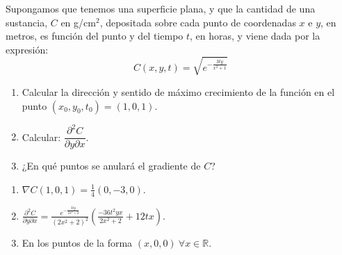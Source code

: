


{Supongamos que tenemos una superficie plana, y que la cantidad de una sustancia, $C$ en g/cm$^2$,
depositada sobre cada punto de coordenadas $x$ e $y$, en metros, es función del punto y del tiempo $t$, en horas, y
viene dada por la expresión:
\[
C(x,y,t) = \sqrt{e^{-\frac{3ty}{x^2+1}}}
\]
\begin{enumerate}
\item Calcular la dirección y sentido de máximo crecimiento de la
función en el punto $(x_0,y_0,t_0)=(1,0,1)$.
\item Calcular: $\dfrac{{\partial ^2 C}}{{\partial y\partial x}}$.
\item ¿En qué puntos se anulará el gradiente de $C$?
\end{enumerate}
}
{\begin{enumerate}
\item $\nabla C(1,0,1) =\frac{1}{4}(0,-3,0)$.
\item $\displaystyle \frac{\partial^2 C}{\partial y\partial x} =
\frac{e^{-\frac{3ty}{2x^2+2}}}{(2x^2+2)^2}\left(\frac{-36t^2yx}{2x^2+2}+12tx\right)$.
\item En los puntos de la forma $(x,0,0)\ \forall x\in \mathbb{R}$.
\end{enumerate}
}
